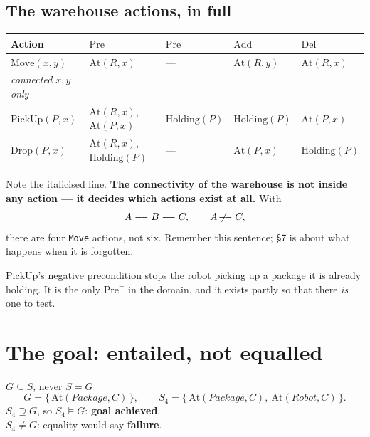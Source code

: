\documentclass[11pt,a4paper]{article}
\newcommand{\ent}{\models}
\begin{document}
\subsection{The warehouse actions, in full}

\begin{center}
\small
\begin{tabular}{@{}lllll@{}}
\toprule
\textbf{Action} & $\mathrm{Pre}^{+}$ & $\mathrm{Pre}^{-}$ & $\mathrm{Add}$ & $\mathrm{Del}$ \\
\midrule
$\mathrm{Move}(x,y)$ & $\mathrm{At}(R,x)$ & --- & $\mathrm{At}(R,y)$ & $\mathrm{At}(R,x)$ \\
\emph{connected $x,y$ only} & & & & \\[4pt]
$\mathrm{PickUp}(P,x)$ & $\mathrm{At}(R,x)$, $\mathrm{At}(P,x)$ & $\mathrm{Holding}(P)$ & $\mathrm{Holding}(P)$ & $\mathrm{At}(P,x)$ \\[4pt]
$\mathrm{Drop}(P,x)$ & $\mathrm{At}(R,x)$, $\mathrm{Holding}(P)$ & --- & $\mathrm{At}(P,x)$ & $\mathrm{Holding}(P)$ \\
\bottomrule
\end{tabular}
\end{center}

Note the italicised line. \textbf{The connectivity of the warehouse is not
inside any action --- it decides which actions exist at all.} With
\[
  A \relbar\joinrel\relbar B \relbar\joinrel\relbar C, \qquad A \not\!\relbar\joinrel\relbar C,
\]
there are four \texttt{Move} actions, not six. Remember this sentence; \S7 is
about what happens when it is forgotten.

$\mathrm{PickUp}$'s negative precondition stops the robot picking up a package
it is already holding. It is the only $\mathrm{Pre}^{-}$ in the domain, and it
exists partly so that there \emph{is} one to test.

\section{The goal: entailed, not equalled}

\begin{keyidea}{$G \subseteq S$, never $S = G$}
\[
  G = \{\, \mathrm{At}(Package, C) \,\}, \qquad
  S_4 = \{\, \mathrm{At}(Package,C),\ \mathrm{At}(Robot,C) \,\}.
\]
$S_4 \supseteq G$, so $S_4 \ent G$: \textbf{goal achieved}. \\
$S_4 \neq G$: equality would say \textbf{failure}.
\end{keyidea}
\end{document}
